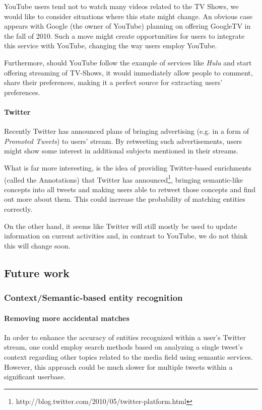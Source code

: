 YouTube users tend not to watch many videos related to the TV Shows, we would
like to consider situations where this state might change. An obvious case
appears with Google (the owner of YouTube) planning on offering GoogleTV in the
fall of 2010. Such a move might create opportunities for users to integrate
this service with YouTube, changing the way users employ YouTube.

Furthermore, should YouTube follow the example of services like \textit{Hulu}
and start offering streaming of TV-Shows, it would immediately allow people to
comment, share their preferences, making it a perfect source for extracting
users' preferences.

\paragraph{Twitter}

Recently Twitter has announced plans of bringing advertising (e.g. in a form of
\textit{Promoted Tweets}) to users' stream.  By retweeting such advertisements,
users might show some interest in additional subjects mentioned in their
streams.

What is far more interesting, is the idea of providing Twitter-based
enrichments (called the Annotations) that Twitter has announced\footnote{http://blog.twitter.com/2010/05/twitter-platform.html},
bringing semantic-like concepts into all tweets and making users able to
retweet those concepts and find out more about them. This could increase
the probability of matching entities correctly.

On the other hand, it seems like Twitter will still mostly be used to update
information on current activities and, in contrast to YouTube, we do not think
this will change soon.

\subsection{Future work}

\subsubsection{Context/Semantic-based entity recognition}

\paragraph{Removing more accidental matches}

In order to enhance the accuracy of entities recognized within a user's Twitter
stream, one could employ search methods based on analyzing a single tweet's
context regarding other topics related to the media field using semantic
services.  However, this approach could be much slower for multiple tweets
within a significant userbase.

